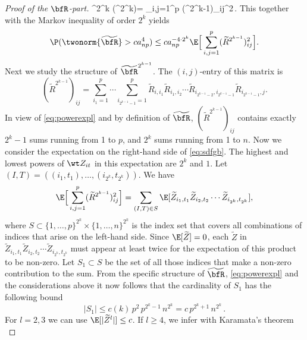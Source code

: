 \begin{proof}[Proof of the $\bfR$-part]
\beao
 \twonorm{\widetilde{\bfR}}^{2^k} \le \tr(\widetilde{\bfR}^{2^k})= \sum_{i,j=1}^p (^{2^{k-1}})_{ij}^2\,.
\eeao
This together with the Markov inequality of order $2^k$ yields
\begin{equation}\label{eq:sdfgb}
\P(  \twonorm{\widetilde{\bfR}}> ca_{np}^{4}) \le c a_{np}^{-4 \cdot 2^k} \E \Big[\sum_{i,j=1}^p (\widetilde{R}^{2^{k-1}})_{ij}^2 \Big] .
\end{equation}
Next we study the structure of $\widetilde{\bfR}^{2^{k-1}}$. The $(i,j)$-entry of this matrix is
\begin{equation}\label{eq:powerexpl}
(\widetilde{R}^{2^{k-1}})_{ij} = \sum_{i_1=1}^p %
\cdots \sum_{i_{2^{k-1}-1}=1}^p \widetilde{R}_{i,i_1} \widetilde{R}_{i_1,i_2}\cdots  \widetilde{R}_{i_{2^{k-1}-2},i_{2^{k-1}-1}} \widetilde{R}_{i_{2^{k-1}-1},j}.
\end{equation}
In view of \eqref{eq:powerexpl} and by definition of $\widetilde{\bfR}$, $(\widetilde{R}^{2^{k-1}} )_{ij}$ contains
exactly $2^k-1$ sums running from 1 to $p$, and $2^k$ sums running from 1 to $n$. 
Now we consider the expectation on the right-hand side of \eqref{eq:sdfgb}. 
The highest and lowest powers of $\wt Z_{it}$ in this expectation are $2^k$ and $1$. Let $(I,T) = ((i_1,t_1), \ldots,(i_{2^k},t_{2^k}))$. We have 
\begin{equation*}
\E \Big[\sum_{i,j=1}^p (\widetilde{R}^{2^{k-1}})_{ij}^2 \Big] = \sum_{(I,T)\in S} \E[\widetilde{Z}_{i_1,t_1} \widetilde{Z}_{i_2,t_2} \cdots \widetilde{Z}_{i_{2^k},t_{2^k}} 
],
\end{equation*}
where $S\subset \{1, \ldots,p\}^{2^k} \times \{1, \ldots,n\}^{2^k}$ is the index set that 
covers all combinations of indices that arise on the left-hand side. 
Since $\E[\widetilde{Z}]=0$, each $\widetilde{Z}$ in $\widetilde{Z}_{i_1,t_1} \widetilde{Z}_{i_2,t_2} \cdots \widetilde{Z}_{i_{2^k},t_{2^k}} $ 
must appear at least twice for the expectation of this product to be non-zero. Let $S_1 \subset S$ be the set of all those indices 
that make  a non-zero contribution to the sum. From the specific structure of $\widetilde{\bfR}$,  \eqref{eq:powerexpl} and the considerations above it now follows that the cardinality of $S_1$ has the following bound
\begin{equation*}
|S_1| \le c(k)\, p^2\, p^{2^k-1}\, n^{2^k}=c\, p^{2^k+1}\,n^{2^k}\,.
\end{equation*}
For $l=2,3$ we can use $\E[|\widetilde{Z}^l|]\le c$. If $l\ge 4$, we infer with Karamata's theorem 
\begin{equation}\label{eq:23424}

\end{equation}
\end{proof}
